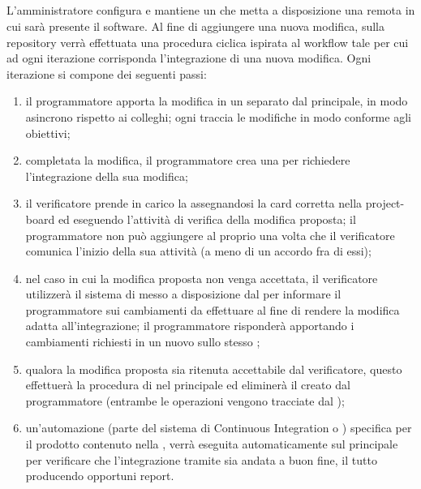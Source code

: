             \subparagraph{}
            L'amministratore configura e mantiene un  che metta a disposizione una  remota in cui sarà presente il software. Al fine di aggiungere una nuova modifica, sulla repository verrà effettuata una procedura ciclica ispirata al workflow  tale per cui ad ogni iterazione corrisponda l'integrazione di una nuova modifica. Ogni iterazione si compone dei seguenti passi:
            \begin{enumerate}
                \item il programmatore apporta la modifica in un  separato dal  principale, in modo asincrono rispetto ai colleghi; ogni  traccia le modifiche in modo conforme agli obiettivi;
                \item completata la modifica, il programmatore crea una  per richiedere l'integrazione della sua modifica;
                \item il verificatore prende in carico la  assegnandosi la card corretta nella project-board ed eseguendo l'attività di verifica della modifica proposta; il programmatore non può aggiungere  al proprio  una volta che il verificatore comunica l'inizio della sua attività (a meno di un accordo fra di essi);
                \item nel caso in cui la modifica proposta non venga accettata, il verificatore utilizzerà il sistema di  messo a disposizione dal  per informare il programmatore sui cambiamenti da effettuare al fine di rendere la modifica adatta all'integrazione; il programmatore risponderà apportando i cambiamenti richiesti in un nuovo  sullo stesso ;
                \item qualora la modifica proposta sia ritenuta accettabile dal verificatore, questo effettuerà la procedura di  nel  principale ed eliminerà il  creato dal programmatore (entrambe le operazioni vengono tracciate dal );
                \item un'automazione (parte del sistema di Continuous Integration o ) specifica per il prodotto contenuto nella , verrà eseguita automaticamente sul  principale per verificare che l'integrazione tramite  sia andata a buon fine, il tutto producendo opportuni report.
            \end{enumerate}

